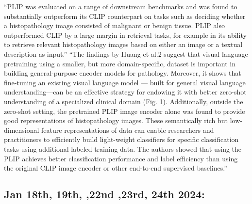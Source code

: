 \documentclass{article}%
\begin{document}
\newline%
\newline%
%
“PLIP was evaluated on a range of downstream benchmarks and was found to substantially outperform its CLIP counterpart on tasks such as deciding whether a histopathology image consisted of malignant or benign tissue. PLIP also outperformed CLIP by a large margin in retrieval tasks, for example in its ability to retrieve relevant histopathology images based on either an image or a textual description as input.”%
\newline%
\newline%
%
“The findings by Huang et al.2 suggest that visual{-}language pretraining using a smaller, but more domain{-}specific, dataset is important in building general{-}purpose encoder models for pathology. Moreover, it shows that fine{-}tuning an existing visual language model — built for general visual language understanding—can be an effective strategy for endowing it with better zero{-}shot understanding of a specialized clinical domain (Fig. 1). Additionally, outside the zero{-}shot setting, the pretrained PLIP image encoder alone was found to provide good representations of histopathology images. These semantically rich but low{-}dimensional feature representations of data can enable researchers and practitioners to efficiently build light{-}weight classifiers for specific classification tasks using additional labeled training data. The authors showed that using the PLIP achieves better classification performance and label efficiency than using the original CLIP image encoder or other end{-}to{-}end supervised baselines.”%
\newline%
\newline%
%
\subsection{Jan 18th, 19th, ,22nd ,23rd, 24th 2024: }%
\label{subsec:Jan18th,19th,,22nd,23rd,24th2024}%
\end{document}
